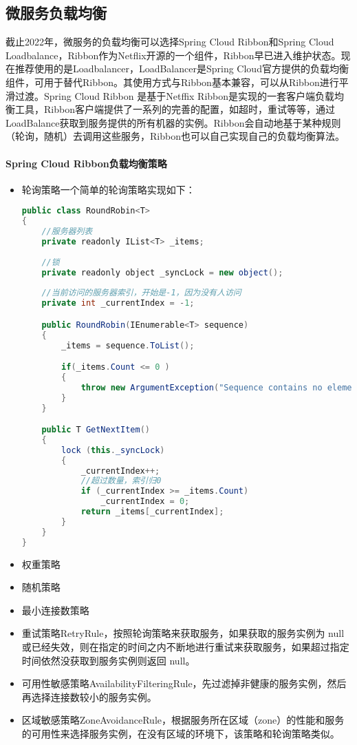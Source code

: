 \documentclass[../../../interview-questions.tex]{subfiles}
\begin{document}
\subsection{微服务负载均衡}

截止2022年，微服务的负载均衡可以选择Spring Cloud Ribbon和Spring Cloud Loadbalance，Ribbon作为Netflix开源的一个组件，Ribbon早已进入维护状态。现在推荐使用的是Loadbalancer，LoadBalancer是Spring Cloud官方提供的负载均衡组件，可用于替代Ribbon。其使用方式与Ribbon基本兼容，可以从Ribbon进行平滑过渡。Spring Cloud Ribbon 是基于​​Netffix Ribbon​​​是实现的一套客户端负载均衡工具，Ribbon客户端提供了一系列的完善的配置，如超时，重试等等，通过​​LoadBalance​​​获取到服务提供的所有机器的实例。Ribbon会自动地基于某种规则​​（轮询，随机）​​ 去调用这些服务，Ribbon也可以自己实现自己的负载均衡算法。

\paragraph{Spring Cloud Ribbon负载均衡策略}

\begin{itemize}
    \item {轮询策略}一个简单的轮询策略实现如下：
    
\begin{lstlisting}[language=Java]
public class RoundRobin<T>
{
    //服务器列表
    private readonly IList<T> _items;
    
    //锁
    private readonly object _syncLock = new object();
    
    //当前访问的服务器索引，开始是-1，因为没有人访问
    private int _currentIndex = -1;

    public RoundRobin(IEnumerable<T> sequence)
    {
        _items = sequence.ToList();

        if(_items.Count <= 0 )
        {
            throw new ArgumentException("Sequence contains no elements.", nameof(sequence));
        }                           
    }

    public T GetNextItem()
    {
        lock (this._syncLock)
        {
            _currentIndex++;
            //超过数量，索引归0
            if (_currentIndex >= _items.Count)
                _currentIndex = 0;
            return _items[_currentIndex];
        }
    }
}    
\end{lstlisting}


    \item {权重策略}
    \item {随机策略}
    \item {最小连接数策略}
    \item {重试策略}RetryRule，按照轮询策略来获取服务，如果获取的服务实例为 null 或已经失效，则在指定的时间之内不断地进行重试来获取服务，如果超过指定时间依然没获取到服务实例则返回 null。
    \item {可用性敏感策略}AvailabilityFilteringRule，先过滤掉非健康的服务实例，然后再选择连接数较小的服务实例。
    \item {区域敏感策略}ZoneAvoidanceRule，根据服务所在区域（zone）的性能和服务的可用性来选择服务实例，在没有区域的环境下，该策略和轮询策略类似。
\end{itemize}
\end{document}
